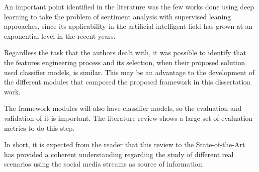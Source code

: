 An important point identified in the literature was the few works done using deep learning to take the problem of sentiment analysis with supervised leaning approaches, since its applicability in the artificial intelligent field has grown at an exponential level in the recent years.

Regardless the task that the authors dealt with, it was possible to identify that the features engineering process and its selection, when their proposed solution used classifier models, is similar. This may be an advantage to the development of the different modules that composed the proposed framework in this dissertation work.

The framework modules will also have classifier models, so the evaluation and validation of it is important. The literature review shows a large set of evaluation metrics to do this step.

In short, it is expected from the reader that this review to the State-of-the-Art has provided a coherent understanding regarding the study of different real scenarios using the social media streams as source of information.

